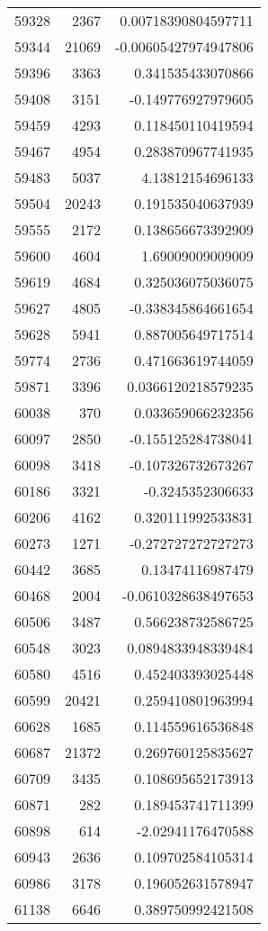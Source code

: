 \begin{tabular}{r | r | r}
59328 & 2367 & 0.00718390804597711 \\
59344 & 21069 & -0.00605427974947806 \\
59396 & 3363 & 0.341535433070866 \\
59408 & 3151 & -0.149776927979605 \\
59459 & 4293 & 0.118450110419594 \\
59467 & 4954 & 0.283870967741935 \\
59483 & 5037 & 4.13812154696133 \\
59504 & 20243 & 0.191535040637939 \\
59555 & 2172 & 0.138656673392909 \\
59600 & 4604 & 1.69009009009009 \\
59619 & 4684 & 0.325036075036075 \\
59627 & 4805 & -0.338345864661654 \\
59628 & 5941 & 0.887005649717514 \\
59774 & 2736 & 0.471663619744059 \\
59871 & 3396 & 0.0366120218579235 \\
60038 & 370 & 0.033659066232356 \\
60097 & 2850 & -0.155125284738041 \\
60098 & 3418 & -0.107326732673267 \\
60186 & 3321 & -0.3245352306633 \\
60206 & 4162 & 0.320111992533831 \\
60273 & 1271 & -0.272727272727273 \\
60442 & 3685 & 0.13474116987479 \\
60468 & 2004 & -0.0610328638497653 \\
60506 & 3487 & 0.566238732586725 \\
60548 & 3023 & 0.0894833948339484 \\
60580 & 4516 & 0.452403393025448 \\
60599 & 20421 & 0.259410801963994 \\
60628 & 1685 & 0.114559616536848 \\
60687 & 21372 & 0.269760125835627 \\
60709 & 3435 & 0.108695652173913 \\
60871 & 282 & 0.189453741711399 \\
60898 & 614 & -2.02941176470588 \\
60943 & 2636 & 0.109702584105314 \\
60986 & 3178 & 0.196052631578947 \\
61138 & 6646 & 0.389750992421508 \\

\end{tabular}
